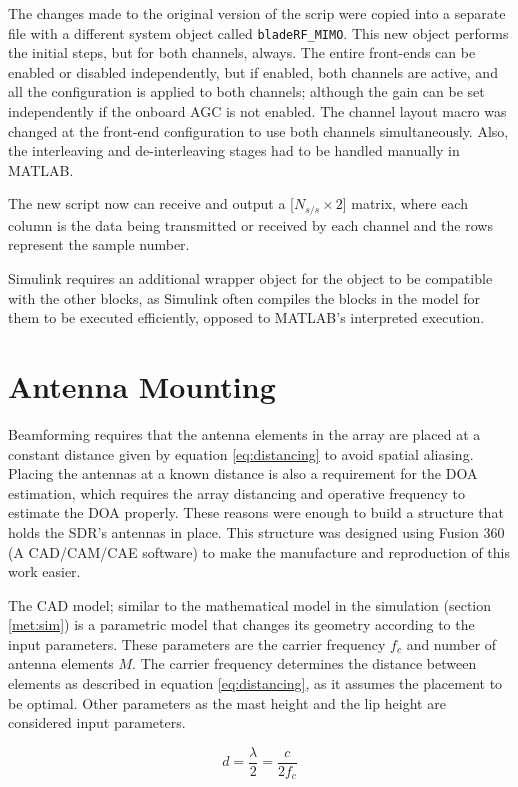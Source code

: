 \documentclass[12pt,a4paper]{report}
\begin{document}
The changes made to the original version of the scrip were copied into a separate file with a different system object called \verb|bladeRF_MIMO|. This new object performs the initial steps, but for both channels, always. The entire front-ends can be enabled or disabled independently, but if enabled, both channels are active, and all the configuration is applied to both channels; although the gain can be set independently if the onboard AGC is not enabled. The channel layout macro was changed at the front-end configuration to use both channels simultaneously. Also, the interleaving and de-interleaving stages had to be handled manually in MATLAB.

The new script now can receive and output a [$N_{s/s} \times 2$] matrix, where each column is the data being transmitted or received by each channel and the rows represent the sample number.

Simulink requires an additional wrapper object for the object to be compatible with the other blocks, as Simulink often compiles the blocks in the model for them to be executed efficiently, opposed to MATLAB's interpreted execution.

\newpage
\section{Antenna Mounting} \label{met:mount}
Beamforming requires that the antenna elements in the array are placed at a constant distance given by equation \ref{eq:distancing} to avoid spatial aliasing. Placing the antennas at a known distance is also a requirement for the DOA estimation, which requires the array distancing and operative frequency to estimate the DOA properly. These reasons were enough to build a structure that holds the SDR's antennas in place. This structure was designed using Fusion 360 (A CAD/CAM/CAE software) to make the manufacture and reproduction of this work easier.

The CAD model; similar to the mathematical model in the simulation (section \ref{met:sim}) is a parametric model that changes its geometry according to the input parameters. These parameters are the carrier frequency $f_c$ and number of antenna elements $M$. The carrier frequency determines the distance between elements as described in equation \ref{eq:distancing}, as it assumes the placement to be optimal. Other parameters as the mast height and the lip height are considered input parameters.

\begin{equation*}
    d = \frac{\lambda}{2} = \frac{c}{2f_c}
\end{equation*}
\end{document}
